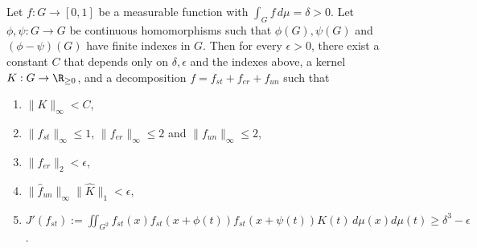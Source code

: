 
\begin{proposition}
\label{prop:regularity_lemma} Let $f: G \to [0, 1]$ be a measurable function with $\int_G f \, d \mu = \delta >0$. Let $\phi, \psi: G \to G$ be continuous homomorphisms such that $\phi(G), \psi(G)$ and $(\phi- \psi)(G)$ have finite indexes in $G$. Then for every $\epsilon > 0$, there exist a constant $C$ that depends only on $\delta, \epsilon$ and the indexes above, a kernel $K: G \to \R_{\geq 0}$, and a decomposition $f = f_{st} + f_{er} + f_{un}$ such that
\begin{enumerate}
    \item $\lVert K \rVert_{\infty} < C$,
    \item $\lVert f_{st} \rVert_{\infty} \leq 1$, $\lVert f_{er} \rVert_{\infty} \leq 2$ and $\lVert f_{un} \rVert_{\infty} \leq 2$,
    \item $\lVert f_{er} \rVert_2 < \epsilon$,
    \item $\lVert \widehat{f}_{un} \rVert_{\infty} \lVert \widehat{K} \rVert_1 < \epsilon$,
    \item $J'(f_{st}) := \displaystyle \iint_{G^2} f_{st}(x) f_{st}(x+ \phi(t)) f_{st}(x+ \psi(t)) K(t) \, d\mu(x) d\mu(t) \geq \delta^3 - \epsilon$.
\end{enumerate}

\end{proposition}
